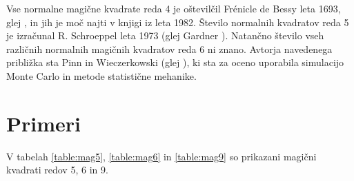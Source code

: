 \documentclass[a4paper,12pt]{article}
\theoremstyle{definition}
\begin{document}
Vse normalne magične kvadrate reda 4 je oštevilčil Frénicle de Bessy
leta 1693, glej \label{bessy}, in jih je moč najti v knjigi \label{berlekamp}
iz leta 1982. Število normalnih kvadratov reda 5 je izračunal
R. Schroeppel leta 1973 (glej Gardner \label{gardner}).
Natančno število vseh različnih normalnih magičnih kvadratov reda 6 ni znano.
Avtorja navedenega približka sta Pinn in Wieczerkowski (glej \label{pinn}), ki
sta za oceno uporabila simulacijo Monte Carlo in metode statistične mehanike.


\section{Primeri}

V tabelah \ref{table:mag5}, \ref{table:mag6} in \ref{table:mag9} so prikazani
magični kvadrati redov 5, 6 in 9.
\end{document}
